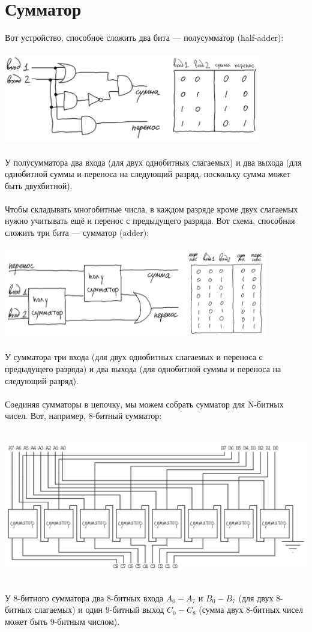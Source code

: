 \documentclass[11pt]{book}
\begin{document}
\section{Сумматор}
Вот устройство, способное сложить два бита --- полусумматор (half-adder):
\\ \\
\includegraphics[height=1.5in]{pic/half_adder.png}
\\ \\
У полусумматора два входа (для двух однобитных слагаемых)
и два выхода (для однобитной суммы и переноса на следующий разряд, поскольку сумма может быть двухбитной).
\\ \\
Чтобы складывать многобитные числа, в каждом разряде кроме двух слагаемых нужно учитывать ещё и перенос с предыдущего разряда.
Вот схема, способная сложить три бита --- сумматор (adder):
\\ \\
\includegraphics[height=1.5in]{pic/adder.png}
\\ \\
У сумматора три входа (для двух однобитных слагаемых и переноса с предыдущего разряда)
и два выхода (для однобитной суммы и переноса на следующий разряд).
\\ \\
Соединяя сумматоры в цепочку, мы можем собрать сумматор для N-битных чисел.
Вот, например, 8-битный сумматор:
\\ \\
\includegraphics[height=2.5in]{pic/n_bit_adder.png}
\\ \\
У 8-битного сумматора два 8-битных входа $A_0 - A_7$ и $B_0 - B_7$ (для двух 8-битных слагаемых)
и один 9-битный выход $C_0 - C_8$ (сумма двух 8-битных чисел может быть 9-битным числом).
\end{document}
